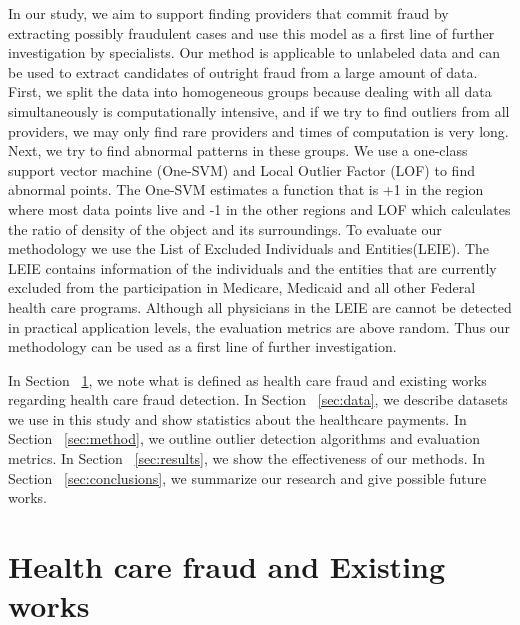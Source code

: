 \documentclass[dvipdfmx, english]{ampmt}             %
\newcommand{\Secref}[1]{Section ~\ref{#1}}
\begin{document}
\par
In our study, we aim to support finding providers that commit fraud by extracting possibly fraudulent cases and use this model as a first line of further investigation by specialists. Our method is applicable to unlabeled data and can be used to extract candidates of outright fraud from a large amount of data. First, we split the data into homogeneous groups because dealing with all data simultaneously is computationally intensive, and if we try to find outliers from all providers, we may only find rare providers and times of computation is very long. Next, we try to find abnormal patterns in these groups.
We use a one-class support vector machine (One-SVM) \cite{OneSVM} and Local Outlier Factor (LOF)\cite{Breunig} to find abnormal points. The One-SVM estimates a function that is +1 in the region where most data points live and -1 in the other regions and LOF which calculates the ratio of density of the object and its surroundings. To evaluate our methodology we use the List of Excluded Individuals and Entities(LEIE)\cite{Leie}. The LEIE contains information of the individuals and the entities that are currently excluded from the participation in Medicare, Medicaid and all other Federal health care programs. Although all physicians in the LEIE are cannot be detected in practical application levels, the evaluation metrics are above random. Thus our methodology can be used as a first line of further investigation.
\par
In \Secref{sec:hcf-and-ex-works}, we note what is defined as health care fraud and existing works regarding health care fraud detection. In \Secref{sec:data}, we describe datasets we use in this study and show statistics about the healthcare payments. In \Secref{sec:method}, we outline outlier detection algorithms and evaluation metrics. In \Secref{sec:results}, we show the effectiveness of our methods. In \Secref{sec:conclusions}, we summarize our research and give possible future works.






\section{Health care fraud and Existing works}\label{sec:hcf-and-ex-works}
\end{document}
